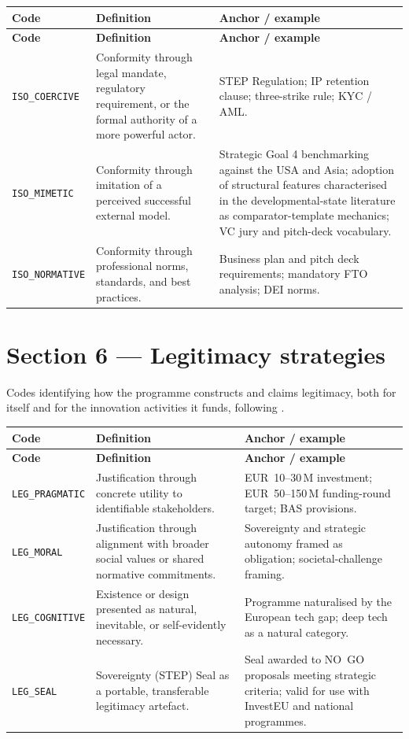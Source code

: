 \begin{longtable}{@{} l p{4.3cm} p{6.3cm} @{}}
\toprule
\textbf{Code} & \textbf{Definition} & \textbf{Anchor / example} \\
\midrule
\endfirsthead
\toprule
\textbf{Code} & \textbf{Definition} & \textbf{Anchor / example} \\
\midrule
\endhead
\bottomrule
\endfoot
\texttt{ISO\_COERCIVE} & Conformity through legal mandate, regulatory requirement, or the formal authority of a more powerful actor. & STEP Regulation; IP retention clause; three-strike rule; KYC / AML. \\
\texttt{ISO\_MIMETIC} & Conformity through imitation of a perceived successful external model. & Strategic Goal 4 benchmarking against the USA and Asia; adoption of structural features characterised in the developmental-state literature as comparator-template mechanics; VC jury and pitch-deck vocabulary. \\
\texttt{ISO\_NORMATIVE} & Conformity through professional norms, standards, and best practices. & Business plan and pitch deck requirements; mandatory FTO analysis; DEI norms. \\
\end{longtable}

\section*{Section 6 --- Legitimacy strategies}

Codes identifying how the programme constructs and claims legitimacy,
both for itself and for the innovation activities it funds, following
\textcite{suchman1995managing}.

\begin{longtable}{@{} l p{4.3cm} p{6.3cm} @{}}
\toprule
\textbf{Code} & \textbf{Definition} & \textbf{Anchor / example} \\
\midrule
\endfirsthead
\toprule
\textbf{Code} & \textbf{Definition} & \textbf{Anchor / example} \\
\midrule
\endhead
\bottomrule
\endfoot
\texttt{LEG\_PRAGMATIC} & Justification through concrete utility to identifiable stakeholders. & EUR~10--30\,M investment; EUR~50--150\,M funding-round target; BAS provisions. \\
\texttt{LEG\_MORAL} & Justification through alignment with broader social values or shared normative commitments. & Sovereignty and strategic autonomy framed as obligation; societal-challenge framing. \\
\texttt{LEG\_COGNITIVE} & Existence or design presented as natural, inevitable, or self-evidently necessary. & Programme naturalised by the European tech gap; deep tech as a natural category. \\
\texttt{LEG\_SEAL} & Sovereignty (STEP) Seal as a portable, transferable legitimacy artefact. & Seal awarded to NO~GO proposals meeting strategic criteria; valid for use with InvestEU and national programmes. \\
\end{longtable}

